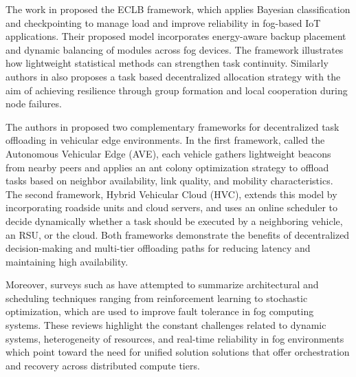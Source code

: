 \documentclass{article}
\begin{document}
The work in \cite{sharifFaulttolerantLoadBalancing2020} proposed the ECLB framework, which applies Bayesian classification and checkpointing to manage load and improve reliability in fog-based IoT applications. Their proposed model incorporates energy-aware backup placement and dynamic balancing of modules across fog devices. The framework illustrates how lightweight statistical methods can strengthen task continuity. Similarly authors in \cite{mudassarDecentralizedLatencyAwareTask2020} also proposes a task based decentralized allocation strategy with the aim of achieving resilience through group formation and local cooperation during node failures. 


The authors in \cite{fengMobileEdgeComputing2019} proposed two complementary frameworks for decentralized task offloading in vehicular edge environments. In the first framework, called the Autonomous Vehicular Edge (AVE), each vehicle gathers lightweight beacons from nearby peers and applies an ant colony optimization strategy to offload tasks based on neighbor availability, link quality, and mobility characteristics. The second framework, Hybrid Vehicular Cloud (HVC), extends this model by incorporating roadside units and cloud servers, and uses an online scheduler to decide dynamically whether a task should be executed by a neighboring vehicle, an RSU, or the cloud. Both frameworks demonstrate the benefits of decentralized decision-making and multi-tier offloading paths for reducing latency and maintaining high availability. 


Moreover, surveys such as \cite{knFaultToleranceFog2025} have attempted to summarize architectural and scheduling techniques ranging from reinforcement learning to stochastic optimization, which are used to improve fault tolerance in fog computing systems. These reviews highlight the constant challenges related to dynamic systems, heterogeneity of resources, and real-time reliability in fog environments which point toward the need for unified solution solutions that offer orchestration and recovery across distributed compute tiers.
\end{document}
